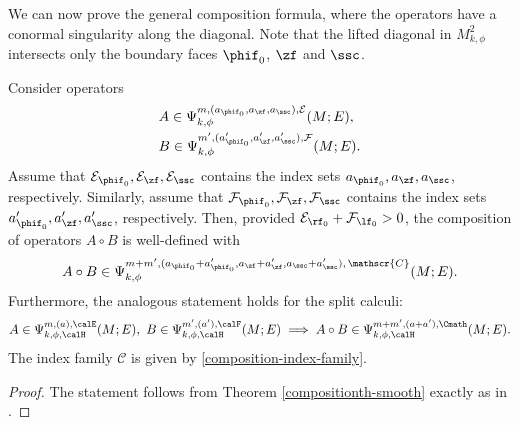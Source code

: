 We can now prove the general composition formula, where the operators have a conormal
singularity along the diagonal. Note that the lifted diagonal in $M^2_{k,\phi}$ intersects only the
boundary faces $\phif_0$, $\zf$ and $\ssc$.

\begin{Th} \label{compositionth}
Consider operators\vspace*{-3pt}
\begin{align*}
&A \in \Psi_{k, \phi}^{m,(a_{\phif_0},a_{\zf}, a_{\ssc}), \mathcal{E}}(M; E), \\
&B \in \Psi_{k, \phi}^{m',(a'_{\phif_0},a'_{\zf}, a'_{\ssc}), \mathcal{F}}(M; E).
\end{align*}
Assume that $\mathcal{E}_{\phif_0},\mathcal{E}_{\zf}, \mathcal{E}_{\ssc}$ contains the
index sets $a_{\phif_0},a_{\zf}, a_{\ssc}$, respectively. Similarly, assume that
$\mathcal{F}_{\phif_0}, \mathcal{F}_{\zf}, \mathcal{F}_{\ssc}$ contains the
index sets $a'_{\phif_0},a'_{\zf}, a'_{\ssc}$, respectively.
Then, provided $\mathcal{E}_{\rf_0} + \mathcal{F}_{\lf_0} > 0$, the composition of operators $A \circ B$
is well-defined with\vspace*{-3pt}
\[
A \circ B \in \Psi_{k, \phi}^{m+m',(a_{\phif_0} + a'_{\phif_0}, a_{\zf} + a'_{\zf}, a_{\ssc}
+ a'_{\ssc}), \,\mathscr{C}}(M; E).
\]
Furthermore, the analogous statement holds for the split calculi:\vspace*{-3pt}
\[
A \in\Psi^{m,(a),\calE}_{k,\phi,\calH}(M; E),\ B\in \Psi^{m',(a'),\calF}_{k,\phi,\calH}(M; E)
\implies
A\circ B \in \Psi^{m+m',(a+a'),\Cmath}_{k,\phi,\calH}(M; E).
\]
The index family $\mathscr{C}$ is given by \eqref{composition-index-family}.
\end{Th}

\begin{proof}
The statement follows from Theorem \ref{compositionth-smooth}
exactly as in \cite[\S 6]{guillarmou2008resolvent}.
\end{proof}
